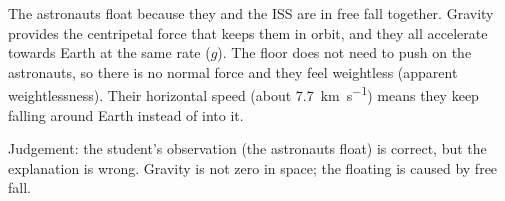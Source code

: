\documentclass[12pt]{article}
\begin{document}
The astronauts float because they and the ISS are in free fall together. Gravity provides the
centripetal force that keeps them in orbit, and they all accelerate towards Earth at the same rate
($g$). The floor does not need to push on the astronauts, so there is no normal force and they feel
weightless (apparent weightlessness). Their horizontal speed (about \qty{7.7}{km.s^{-1}}) means they
keep falling around Earth instead of into it.

Judgement: the student's observation (the astronauts float) is correct, but the explanation is
wrong. Gravity is not zero in space; the floating is caused by free fall.
\end{document}
